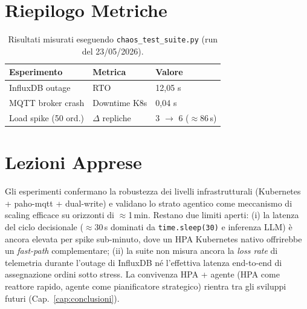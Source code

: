 \section{Riepilogo Metriche}
\label{sec:riepilogo_chaos}

\begin{table}[ht]
\centering
\begin{tabular}{lll}
\hline
\textbf{Esperimento} & \textbf{Metrica} & \textbf{Valore} \\ \hline
InfluxDB outage      & RTO              & 12{,}05 s \\
MQTT broker crash    & Downtime K8s     & 0{,}04 s \\
Load spike (50 ord.) & $\Delta$ repliche & 3 $\rightarrow$ 6 ($\approx$86\,s) \\ \hline
\end{tabular}
\caption{Risultati misurati eseguendo \texttt{chaos\_test\_suite.py} (run del 23/05/2026).}
\label{tab:chaos_results}
\end{table}

\section{Lezioni Apprese}
\label{sec:lezioni_chaos}
Gli esperimenti confermano la robustezza dei livelli infrastrutturali (Kubernetes + paho-mqtt + dual-write) e validano lo strato agentico come meccanismo di scaling efficace su orizzonti di $\approx$1\,min. Restano due limiti aperti: (i) la latenza del ciclo decisionale ($\approx$30\,s dominati da \texttt{time.sleep(30)} e inferenza LLM) è ancora elevata per spike sub-minuto, dove un HPA Kubernetes nativo offrirebbe un \emph{fast-path} complementare; (ii) la suite non misura ancora la \textit{loss rate} di telemetria durante l'outage di InfluxDB né l'effettiva latenza end-to-end di assegnazione ordini sotto stress. La convivenza HPA + agente (HPA come reattore rapido, agente come pianificatore strategico) rientra tra gli sviluppi futuri (Cap.~\ref{cap:conclusioni}).